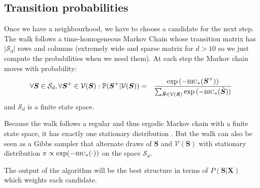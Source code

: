 \documentclass[12pt,a4paper]{report}
\begin{document}
	
	
	\subsection{Transition probabilities}
		Once we have a neighbourhood, we have to choose a candidate for the next step.
The walk follows a time-homogeneous Markov Chain whose transition matrix %
has $|\mathcal{S}_d|$ rows and columns (extremely wide  and sparse matrix for $d>10$ so we just compute the probabilities when we need them).
	At each step the Markov chain moves with probability:
	\begin{eqnarray}
			\forall \boldsymbol{S} \in \mathcal{S}_d, \forall \boldsymbol{S}^+\in \mathcal{V}(\boldsymbol{S}): %
			\mathbb{P}(\boldsymbol{S}^+|\mathcal{V}(\boldsymbol{S}))&=&\frac{\exp{(-\mbox{{\sc bic}}_*(\boldsymbol{S}^+))}}{\sum_{\tilde{\boldsymbol{S}}\in \mathcal{V}(\boldsymbol{S})}\exp{(-\mbox{{\sc bic}}_*(\tilde{\boldsymbol{S}}))}} \label{transitionproba}
	\end{eqnarray}
	and $\mathcal{S}_d$ is a finite state space.%
	 
Because the walk follows a regular and thus ergodic Markov chain with a finite state space, it has exactly one stationary distribution \cite{grinstead1997introduction}. %
%	
%	
%	
But the walk can also be seen as a Gibbs sampler \cite{casella1992explaining} that alternate draws of $\boldsymbol{S}$ and  $\mathcal{V}(\boldsymbol{S})$ with stationary distribution $\pi \propto \operatorname{exp}(-\mbox{{\sc bic}}_*(\cdot))$ on the space $\mathcal{S}_d$.
	
The output of the algorithm will be the best structure in terms of $P(\boldsymbol{S}|\boldsymbol{X})$ which weights each candidate. 
	
\end{document}
